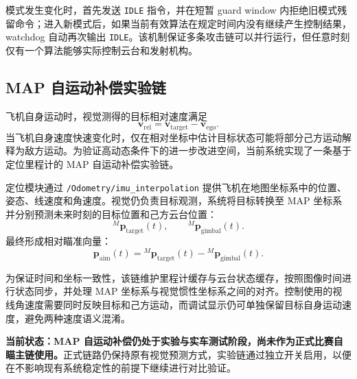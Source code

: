 模式发生变化时，首先发送 \lstinline{IDLE} 指令，并在短暂 guard window 内拒绝旧模式残留命令；进入新模式后，如果当前有效算法在规定时间内没有继续产生控制结果，watchdog 自动再次输出 \lstinline{IDLE}。该机制保证多条攻击链可以并行运行，但任意时刻仅有一个算法能够实际控制云台和发射机构。

\subsection{MAP 自运动补偿实验链}
飞机自身运动时，视觉测得的目标相对速度满足
\begin{equation}
    \boldsymbol{v}_{\mathrm{rel}}
    = \boldsymbol{v}_{\mathrm{target}}
    - \boldsymbol{v}_{\mathrm{ego}} .
\end{equation}
当飞机自身速度快速变化时，仅在相对坐标中估计目标状态可能将部分己方运动解释为敌方运动。为验证高动态条件下的进一步改进空间，当前系统实现了一条基于定位里程计的 MAP 自运动补偿实验链。

定位模块通过 \lstinline{/Odometry/imu_interpolation} 提供飞机在地图坐标系中的位置、姿态、线速度和角速度。视觉仍负责目标观测，系统将目标转换至 MAP 坐标系并分别预测未来时刻的目标位置和己方云台位置：
\begin{equation}
    {}^{M}\boldsymbol{p}_{\mathrm{target}}(t),
    \qquad
    {}^{M}\boldsymbol{p}_{\mathrm{gimbal}}(t).
\end{equation}
最终形成相对瞄准向量：
\begin{equation}
    \boldsymbol{p}_{\mathrm{aim}}(t)
    = {}^{M}\boldsymbol{p}_{\mathrm{target}}(t)
    - {}^{M}\boldsymbol{p}_{\mathrm{gimbal}}(t).
\end{equation}

为保证时间和坐标一致性，该链维护里程计缓存与云台状态缓存，按照图像时间进行状态同步，并处理 MAP 坐标系与视觉惯性坐标系之间的对齐。控制使用的视线角速度需要同时反映目标和己方运动，而调试显示仍可单独保留目标自身运动速度，避免两种速度语义混淆。

\textbf{当前状态：MAP 自运动补偿仍处于实验与实车测试阶段，尚未作为正式比赛自瞄主链使用。}正式链路仍保持原有视觉预测方式，实验链通过独立开关启用，以便在不影响现有系统稳定性的前提下继续进行对比验证。

\newpage
